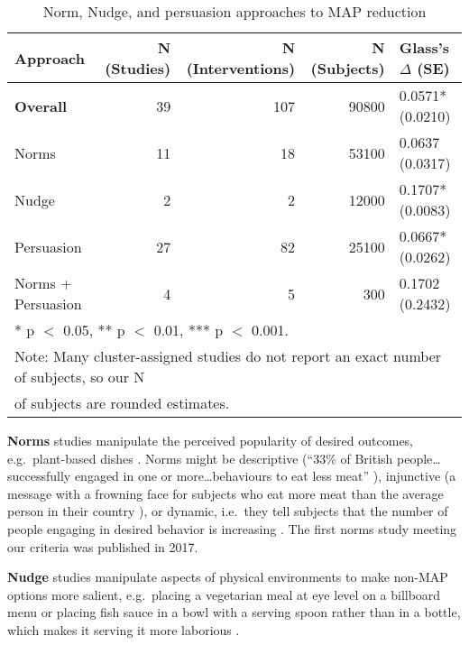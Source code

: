 \documentclass[sn-nature,pdflatex]{sn-jnl}
\begin{document}
\begin{table}[!h]
\centering
\caption{\label{tab:tab:table_one}Norm, Nudge, and persuasion approaches to MAP reduction}
\centering
\begin{tabular}[t]{lrrrl}
\toprule
Approach & N (Studies) & N (Interventions) & N (Subjects) & Glass's $\Delta$ (SE)\\
\midrule
\textbf{Overall} & 39 & 107 & 90800 & 0.0571* (0.0210)\\
Norms & 11 & 18 & 53100 & 0.0637 (0.0317)\\
Nudge & 2 & 2 & 12000 & 0.1707* (0.0083)\\
Persuasion & 27 & 82 & 25100 & 0.0667* (0.0262)\\
Norms + Persuasion & 4 & 5 & 300 & 0.1702 (0.2432)\\
\bottomrule
\multicolumn{5}{l}{\rule{0pt}{1em}* p $<$ 0.05, ** p $<$ 0.01, *** p $<$ 0.001.}\\
\multicolumn{5}{l}{\textsuperscript{} Note: Many cluster-assigned studies do not report an exact number of subjects, \linebreak so our N}\\
\multicolumn{5}{l}{of subjects are rounded estimates.}\\
\end{tabular}
\end{table}

\textbf{Norms} studies
\citep{aldoh2023, allen2002, alblas2023, coker2022, griesoph2021, piester2020, sparkman2017, sparkman2020}
manipulate the perceived popularity of desired outcomes,
e.g.~plant-based dishes \citep{sparkman2017}. Norms might be descriptive
(``33\% of British people\ldots successfully engaged in one or
more\ldots behaviours to eat less meat'' \citep{aldoh2023}), injunctive
(a message with a frowning face for subjects who eat more meat than the
average person in their country \citep{alblas2023}), or dynamic,
i.e.~they tell subjects that the number of people engaging in desired
behavior is increasing
\citep{aldoh2023, coker2022, sparkman2017, sparkman2020}. The first
norms study meeting our criteria was published in 2017.

\textbf{Nudge} studies \citep{andersson2021, kanchanachitra2020}
manipulate aspects of physical environments to make non-MAP options more
salient, e.g.~placing a vegetarian meal at eye level on a billboard menu
\citep{andersson2021} or placing fish sauce in a bowl with a serving
spoon rather than in a bottle, which makes it serving it more laborious
\citep{kanchanachitra2020}.
\end{document}
